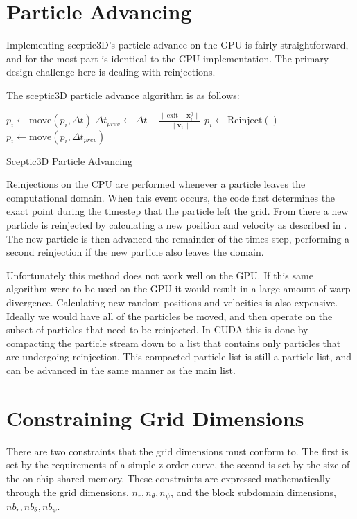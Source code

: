 	\section{Particle Advancing}
	Implementing sceptic3D's particle advance on the GPU is fairly straightforward, and for the most part is identical to the CPU implementation. The primary design challenge here is dealing with reinjections.

The sceptic3D particle advance algorithm is as follows:

\begin{algorithm}
	\begin{algorithmic}
		\STATE $p_i \leftarrow \mathrm{move}(p_i,\Delta t)$
			\STATE $\Delta t_{prev} \leftarrow \Delta t - \frac{\|\mathbf{\mathrm{exit}} - \mathbf{x}_i^0\|}{\|\mathbf{v}_i\|}$
			\STATE $p_i \leftarrow \mathrm{Reinject}()$
			\STATE $p_i \leftarrow \mathrm{move}(p_i,\Delta t_{prev})$
		\ENDWHILE	
		\ENDFOR
	\end{algorithmic}
	\caption{Sceptic3D Particle Advancing}
	\label{alg:padvnc}
\end{algorithm}

Reinjections on the CPU are performed whenever a particle leaves the computational domain. When this event occurs, the code first determines the exact point during the timestep that the particle left the grid. From there a new particle is reinjected by calculating a new position and velocity as described in \cite{Patacchini2007}. The new particle is then advanced the remainder of the times step, performing a second reinjection if the new particle also leaves the domain. 

Unfortunately this method does not work well on the GPU. If this same algorithm were to be used on the GPU it would result in a large amount of warp divergence. Calculating new random positions and velocities is also expensive. Ideally we would have all of the particles be moved, and then operate on the subset of particles that need to be reinjected. In CUDA this is done by compacting the particle stream down to a list that contains only particles that are undergoing reinjection. This compacted particle list is still a particle list, and can be advanced in the same manner as the main list.  

	\section{Constraining Grid Dimensions}
	\label{sec:grid_constraincts}
There are two constraints that the grid dimensions must conform to. The first is set by the requirements of a simple z-order curve, the second is set by the size of the on chip shared memory. These constraints are expressed mathematically through the grid dimensions, $n_r, n_{\theta}, n_{\psi}$, and the block subdomain dimensions, $nb_r, nb_{\theta}, nb_{\psi}$.
		
